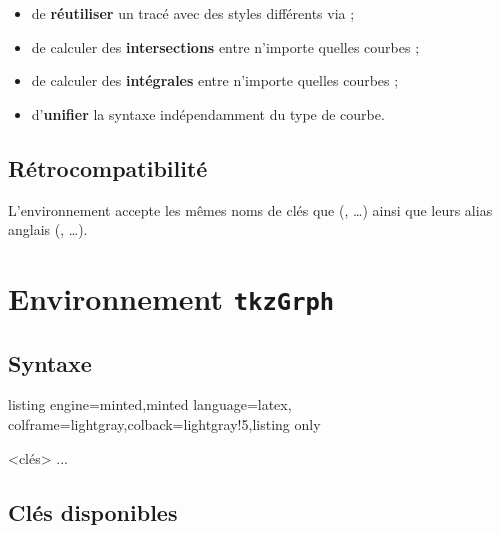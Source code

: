 \documentclass[11pt,a4paper]{ltxdoc}
\begin{document}
\begin{itemize}
	\item de \textbf{réutiliser} un tracé avec des styles différents via  ;
	\item de calculer des \textbf{intersections} entre n'importe quelles courbes ;
	\item de calculer des \textbf{intégrales} entre n'importe quelles courbes ;
	\item d'\textbf{unifier} la syntaxe indépendamment du type de courbe.
\end{itemize}

\subsection{Rétrocompatibilité}

L'environnement  accepte les mêmes noms de clés que  (, \ldots) ainsi que leurs alias anglais (, \ldots).

\pagebreak

\section{Environnement \texttt{tkzGrph}}

\subsection{Syntaxe}

\begin{tcblisting}{listing engine=minted,minted language=latex,
  colframe=lightgray,colback=lightgray!5,listing only}
\begin{tkzGrph}<clés>
  ...
\end{tkzGrph}
\end{tcblisting}

\subsection{Clés disponibles}
\end{document}
